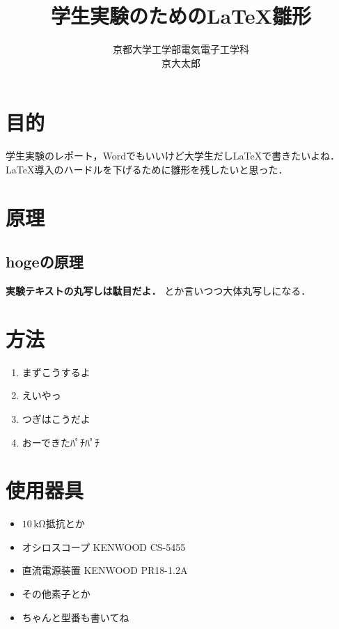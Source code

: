 \documentclass[autodetect-engine,dvipdfmx-if-dvi,ja=standard,a4paper,11pt,titlepage]{bxjsarticle}
\newcommand{\crm}[1]{\mbox{$\,\mathrm{#1}$}}
\begin{document}
\title{学生実験のための\LaTeX{}雛形}
\author{京都大学工学部電気電子工学科 \\ 京大太郎}
\maketitle
\section{目的}
学生実験のレポート，Wordでもいいけど大学生だし\LaTeX{}で書きたいよね．\\
\LaTeX{}導入のハードルを下げるために雛形を残したいと思った．
\section{原理}
\subsection{hogeの原理}
\label{sub:m_hoge}
{\bf 実験テキストの丸写しは駄目だよ．}
とか言いつつ大体丸写しになる．
\section{方法}
\begin{enumerate}
  \item まずこうするよ
  \item えいやっ
  \item つぎはこうだよ
  \item おーできたﾊﾟﾁﾊﾟﾁ
\end{enumerate}
\section{使用器具}
\begin{itemize}
  \item $10\crm{k\Omega}$抵抗とか
  \item オシロスコープ KENWOOD CS-5455
  \item 直流電源装置 KENWOOD PR18-1.2A
  \item その他素子とか
  \item ちゃんと型番も書いてね
\end{itemize}
\end{document}
